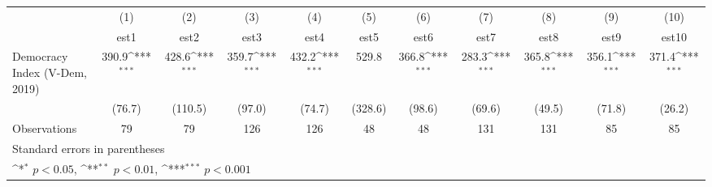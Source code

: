 {
\def\sym#1{\ifmmode^{#1}\else\(^{#1}\)\fi}
\begin{tabular}{l*{10}{c}}
\hline\hline
                    &\multicolumn{1}{c}{(1)}         &\multicolumn{1}{c}{(2)}         &\multicolumn{1}{c}{(3)}         &\multicolumn{1}{c}{(4)}         &\multicolumn{1}{c}{(5)}         &\multicolumn{1}{c}{(6)}         &\multicolumn{1}{c}{(7)}         &\multicolumn{1}{c}{(8)}         &\multicolumn{1}{c}{(9)}         &\multicolumn{1}{c}{(10)}         \\
                    &        est1         &        est2         &        est3         &        est4         &        est5         &        est6         &        est7         &        est8         &        est9         &       est10         \\
\hline
Democracy Index (V-Dem, 2019)&       390.9\sym{***}&       428.6\sym{***}&       359.7\sym{***}&       432.2\sym{***}&       529.8         &       366.8\sym{***}&       283.3\sym{***}&       365.8\sym{***}&       356.1\sym{***}&       371.4\sym{***}\\
                    &      (76.7)         &     (110.5)         &      (97.0)         &      (74.7)         &     (328.6)         &      (98.6)         &      (69.6)         &      (49.5)         &      (71.8)         &      (26.2)         \\
\hline
Observations        &          79         &          79         &         126         &         126         &          48         &          48         &         131         &         131         &          85         &          85         \\
\hline\hline
\multicolumn{11}{l}{\footnotesize Standard errors in parentheses}\\
\multicolumn{11}{l}{\footnotesize \sym{*} \(p<0.05\), \sym{**} \(p<0.01\), \sym{***} \(p<0.001\)}\\
\end{tabular}
}
